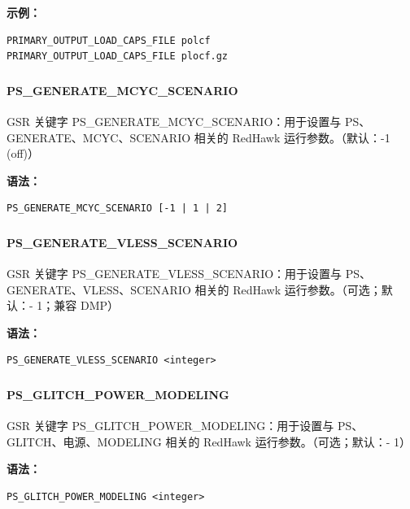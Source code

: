 \textbf{示例：}
\begin{lstlisting}
PRIMARY_OUTPUT_LOAD_CAPS_FILE polcf
PRIMARY_OUTPUT_LOAD_CAPS_FILE plocf.gz
\end{lstlisting}

\subsubsection{}
\paragraph*{PS_GENERATE_MCYC_SCENARIO}

GSR 关键字 PS_GENERATE_MCYC_SCENARIO：用于设置与 PS、GENERATE、MCYC、SCENARIO 相关的 RedHawk 运行参数。（默认：-1 (off)）

\textbf{语法：}
\begin{lstlisting}
PS_GENERATE_MCYC_SCENARIO [-1 | 1 | 2]
\end{lstlisting}

\subsubsection{}
\paragraph*{PS_GENERATE_VLESS_SCENARIO}

GSR 关键字 PS_GENERATE_VLESS_SCENARIO：用于设置与 PS、GENERATE、VLESS、SCENARIO 相关的 RedHawk 运行参数。（可选；默认：- 1；兼容 DMP）

\textbf{语法：}
\begin{lstlisting}
PS_GENERATE_VLESS_SCENARIO <integer>
\end{lstlisting}

\subsubsection{}
\paragraph*{PS_GLITCH_POWER_MODELING}

GSR 关键字 PS_GLITCH_POWER_MODELING：用于设置与 PS、GLITCH、电源、MODELING 相关的 RedHawk 运行参数。（可选；默认：- 1）

\textbf{语法：}
\begin{lstlisting}
PS_GLITCH_POWER_MODELING <integer>
\end{lstlisting}

